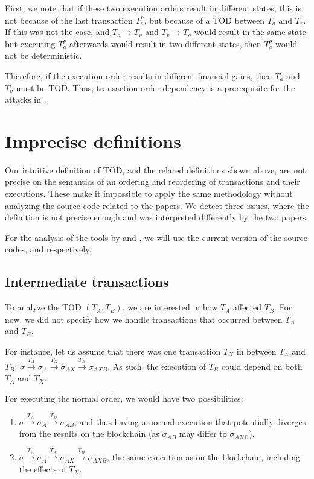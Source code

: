 \documentclass[draft,final]{vutinfth} %
\begin{document}
First, we note that if these two execution orders result in different states, this is not because of the last transaction $T_a^p$, but because of a TOD between $T_a$ and $T_v$. If this was not the case, and $T_a \rightarrow T_v$ and $T_v \rightarrow T_a$ would result in the same state but executing $T_a^p$ afterwards would result in two different states, then $T_a^p$ would not be deterministic.

Therefore, if the execution order results in different financial gains, then $T_a$ and $T_v$ must be TOD. Thus, transaction order dependency is a prerequisite for the attacks in \cite{zhang_combatting_2023}.

\section{Imprecise definitions}

Our intuitive definition of TOD, and the related definitions shown above, are not precise on the semantics of an ordering and reordering of transactions and their executions. These make it impossible to apply the same methodology without analyzing the source code related to the papers. We detect three issues, where the definition is not precise enough and was interpreted differently by the two papers.

For the analysis of the tools by \cite{zhang_combatting_2023} and \cite{torres_frontrunner_2021}, we will use the current version of the source codes, \cite{noauthor_troublorerebus-redgiant_2024} and \cite{noauthor_christoftorresfrontrunner-jones_2024} respectively.

\subsection{Intermediate transactions}

To analyze the TOD $(T_A, T_B)$, we are interested in how $T_A$ affected $T_B$. For now, we did not specify how we handle transactions that occurred between $T_A$ and $T_B$.

For instance, let us assume that there was one transaction $T_X$ in between $T_A$ and $T_B$: $\sigma \xrightarrow{T_A} \sigma_A \xrightarrow{T_X} \sigma_{AX} \xrightarrow{T_B} \sigma_{AXB}$. As such, the execution of $T_B$ could depend on both $T_A$ and $T_X$.

For executing the normal order, we would have two possibilities:

\begin{enumerate}
    \item $\sigma \xrightarrow{T_A} \sigma_A \xrightarrow{T_B} \sigma_{AB}$, and thus having a normal execution that potentially diverges from the results on the blockchain (as $\sigma_{AB}$ may differ to $\sigma_{AXB}$).
    \item $\sigma \xrightarrow{T_A} \sigma_A \xrightarrow{T_X} \sigma_{AX} \xrightarrow{T_B} \sigma_{AXB}$, the same execution as on the blockchain, including the effects of $T_X$.
\end{enumerate}
\end{document}
